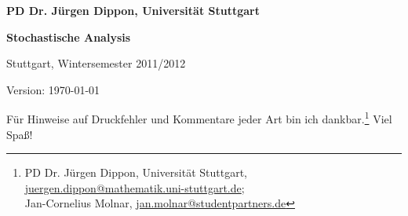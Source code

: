 \documentclass[%
	paper=a5,%
	fleqn,%
	DIV=18,%
	BCOR=0mm,
	fontsize=11pt,
	titlepage=false,%
	bibliography=totoc,
	DIV=18,%
	twoside=true,
	pdftitle=Stochastische Analysis,
	pdfauthor=Jürgen Dippon,
	numbers=noendperiod]%
	{scrbook}
\begin{document}

\begin{titlepage}
\vspace*{2mm}
\noindent\bf\color{gdarkgray}
PD Dr. Jürgen Dippon, Universität Stuttgart

\begin{center}
\vspace*{10mm}
{\noindent\huge\bf\color{darkblue} Stochastische Analysis}

\vspace*{4mm}

Stuttgart, Wintersemester 2011/2012
\end{center}

\vspace*{\fill}

\begin{flushright}
\small
Version: \today\
\vspace*{5mm}

Für Hinweise auf Druckfehler und Kommentare jeder Art bin ich 
dankbar.\footnote{\color{gdarkgray}
PD Dr. Jürgen Dippon, Universität Stuttgart,
\href{mailto:juergen.dippon@mathematik.uni-stuttgart.de}{juergen.dippon@mathematik.uni-stuttgart.de};\\
Jan-Cornelius Molnar,
\href{mailto:jan.molnar@studentpartners.de}{jan.molnar@studentpartners.de}
}
Viel Spaß!
\end{flushright}
\end{titlepage}


\tableofcontents














\clearpage
{}
\printindex

\clearpage
\printnomenclature[2cm]

\nocite{*}



\end{document}
